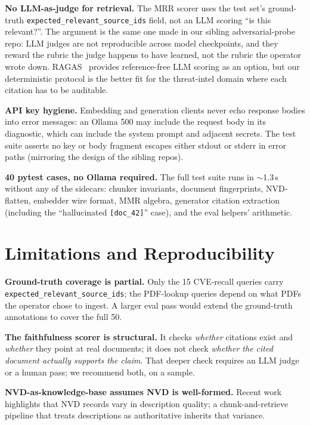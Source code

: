 \documentclass[conference]{IEEEtran}
\begin{document}
\textbf{No LLM-as-judge for retrieval.} The MRR scorer uses the test
set's ground-truth \texttt{expected\_relevant\_source\_ids} field,
not an LLM scoring ``is this relevant?''. The argument is the same
one made in our sibling adversarial-probe repo: LLM judges are not
reproducible across model checkpoints, and they reward the rubric
the judge happens to have learned, not the rubric the operator
wrote down. RAGAS~\cite{es2023ragas} provides reference-free LLM
scoring as an option, but our deterministic protocol is the better
fit for the threat-intel domain where each citation has to be
auditable.

\textbf{API key hygiene.} Embedding and generation clients never
echo response bodies into error messages: an Ollama 500 may include
the request body in its diagnostic, which can include the system
prompt and adjacent secrets. The test suite asserts no key or body
fragment escapes either stdout or stderr in error paths (mirroring
the design of the sibling repos).

\textbf{40 pytest cases, no Ollama required.} The full test suite
runs in $\sim$1.3\,s without any of the sidecars: chunker
invariants, document fingerprints, NVD-flatten, embedder wire
format, MMR algebra, generator citation extraction (including the
``hallucinated \texttt{[doc\_42]}'' case), and the eval helpers'
arithmetic.

\section{Limitations and Reproducibility}
\label{sec:limits}

\textbf{Ground-truth coverage is partial.} Only the 15 CVE-recall
queries carry \texttt{expected\_relevant\_source\_ids}; the
PDF-lookup queries depend on what PDFs the operator chose to ingest.
A larger eval pass would extend the ground-truth annotations to
cover the full 50.

\textbf{The faithfulness scorer is structural.} It checks
\emph{whether} citations exist and \emph{whether} they point at real
documents; it does not check \emph{whether the cited document
actually supports the claim}. That deeper check requires an LLM
judge or a human pass; we recommend both, on a sample.

\textbf{NVD-as-knowledge-base assumes NVD is well-formed.} Recent
work~\cite{nguyen2024cveqa} highlights that NVD records vary in
description quality; a chunk-and-retrieve pipeline that treats
descriptions as authoritative inherits that variance.
\end{document}
